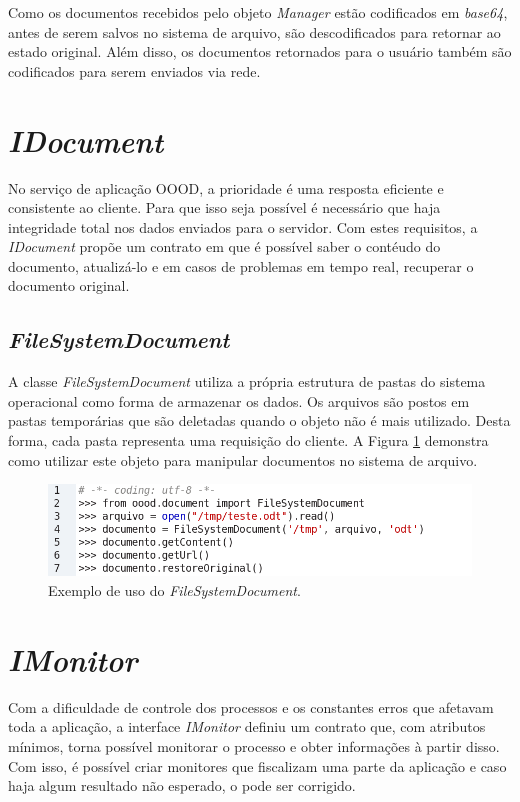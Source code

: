 Como os documentos recebidos pelo objeto \textit{Manager} estão codificados em \textit{base64}, antes de serem salvos no sistema de arquivo, são descodificados para retornar ao estado original. Além disso, os documentos retornados para o usuário também são codificados para serem enviados via rede.

\section{\textit{IDocument}}
No serviço de aplicação OOOD, a prioridade é uma resposta eficiente e consistente ao cliente. Para que isso seja possível é necessário que haja integridade total nos dados enviados para o servidor. Com estes requisitos, a \textit{IDocument} propõe um contrato em que é possível saber o contéudo do documento, atualizá-lo e em casos de problemas em tempo real, recuperar o documento original.

\subsection{\textit{FileSystemDocument}}
\label{fsd}
A classe \textit{FileSystemDocument} utiliza a própria estrutura de pastas do sistema operacional como forma de armazenar os dados. Os arquivos são postos em pastas temporárias que são deletadas quando o objeto não é mais utilizado. Desta forma, cada pasta representa uma requisição do cliente. A Figura \ref{exemplo:fss} demonstra como utilizar este objeto para manipular documentos no sistema de arquivo.

\begin{figure}[!ht]
\centering
\begin{center}
\includegraphics[scale=0.677,bb=0 0 490 95]{fss_exemplo.png}
\end{center}
\caption{Exemplo de uso do \textit{FileSystemDocument}.}
\label{exemplo:fss}
\end{figure}

\section{\textit{IMonitor}}

Com a dificuldade de controle dos processos e os constantes erros que afetavam toda a aplicação, a interface \textit{IMonitor} definiu um contrato que, com atributos mínimos, torna possível monitorar o processo e obter informações à partir disso. Com isso, é possível criar monitores que fiscalizam uma parte da aplicação e caso haja algum resultado não esperado, o pode ser corrigido.

